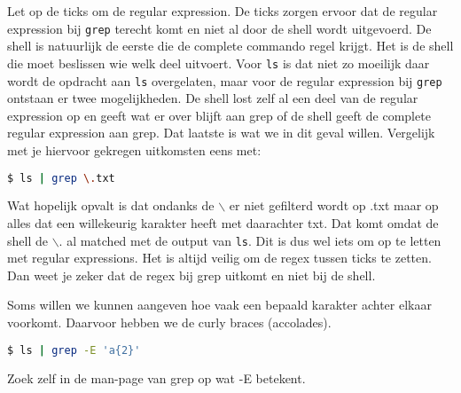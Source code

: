 Let op de ticks om de regular expression. De ticks zorgen ervoor dat de regular expression bij \texttt{grep} terecht komt en niet al door de shell wordt uitgevoerd. De shell is natuurlijk de eerste die de complete commando regel krijgt. Het is de shell die moet beslissen wie welk deel uitvoert. Voor \texttt{ls} is dat niet zo moeilijk  daar wordt de opdracht aan \texttt{ls} overgelaten, maar voor de regular expression bij \texttt{grep} ontstaan er twee mogelijkheden. De shell lost zelf al een deel van de regular expression op en geeft wat er over blijft aan grep of de shell geeft de complete regular expression aan grep. Dat laatste is wat we in dit geval willen. Vergelijk met je hiervoor gekregen uitkomsten eens met:
\begin{lstlisting}[language=bash]
$ ls | grep \.txt
\end{lstlisting}
Wat hopelijk opvalt is dat ondanks de $\backslash$ er niet gefilterd wordt op .txt maar op alles dat een willekeurig karakter heeft met daarachter txt. Dat komt omdat de shell de $\backslash$. al matched met de output van \texttt{ls}. Dit is dus wel iets om op te letten met regular expressions. Het is altijd veilig om de regex tussen ticks te zetten. Dan weet je zeker dat de regex bij grep uitkomt en niet bij de shell.

Soms willen we kunnen aangeven hoe vaak een bepaald karakter achter elkaar voorkomt. Daarvoor hebben we de curly braces (accolades).
\begin{lstlisting}[language=bash]
$ ls | grep -E 'a{2}'
\end{lstlisting}
Zoek zelf in de man-page van grep op wat -E betekent.
